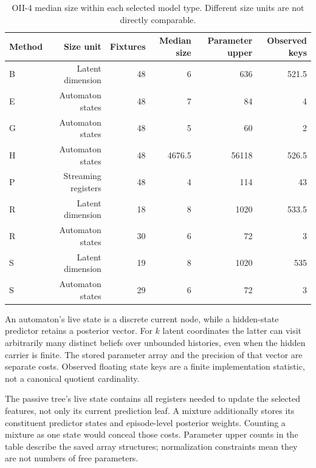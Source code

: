 \begin{table}[tbp]
\centering
\caption{OII-4 median size within each selected model type. Different size units are not directly comparable.}\label{tab:complexity}
\footnotesize
\setlength{\tabcolsep}{5pt}
\begin{tabular}{lrrrrr}
\toprule
Method & Size unit & Fixtures & Median size & Parameter upper & Observed keys \\
\midrule
B & Latent dimension & 48 & 6 & 636 & 521.5 \\
E & Automaton states & 48 & 7 & 84 & 4 \\
G & Automaton states & 48 & 5 & 60 & 2 \\
H & Automaton states & 48 & 4676.5 & 56118 & 526.5 \\
P & Streaming registers & 48 & 4 & 114 & 43 \\
R & Latent dimension & 18 & 8 & 1020 & 533.5 \\
R & Automaton states & 30 & 6 & 72 & 3 \\
S & Latent dimension & 19 & 8 & 1020 & 535 \\
S & Automaton states & 29 & 6 & 72 & 3 \\
\bottomrule
\end{tabular}
\par{}
\end{table}


An automaton's live state is a discrete current node, while a hidden-state predictor retains a posterior vector. For $k$ latent coordinates the latter can visit arbitrarily many distinct beliefs over unbounded histories, even when the hidden carrier is finite. The stored parameter array and the precision of that vector are separate costs. Observed floating state keys are a finite implementation statistic, not a canonical quotient cardinality.

The passive tree's live state contains all registers needed to update the selected features, not only its current prediction leaf. A mixture additionally stores its constituent predictor states and episode-level posterior weights. Counting a mixture as one state would conceal those costs. Parameter upper counts in the table describe the saved array structures; normalization constraints mean they are not numbers of free parameters.


